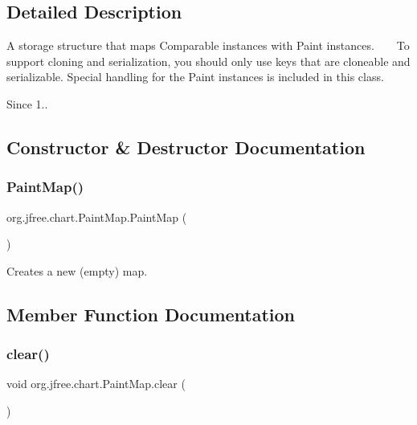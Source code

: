 \subsection{Detailed Description}
A storage structure that maps {\ttfamily Comparable} instances with {\ttfamily Paint} instances. ~\newline
~\newline
 To support cloning and serialization, you should only use keys that are cloneable and serializable. Special handling for the {\ttfamily Paint} instances is included in this class.

\begin{DoxySince}{Since}
1.. 
\end{DoxySince}


\subsection{Constructor \& Destructor Documentation}
\mbox{\label{classorg_1_1jfree_1_1chart_1_1_paint_map_a1685803b58df9efd74550f791c47c9ad}} 
\subsubsection{\texorpdfstring{Paint\+Map()}{PaintMap()}}
{\footnotesize\ttfamily org.\+jfree.\+chart.\+Paint\+Map.\+Paint\+Map (\begin{DoxyParamCaption}{ }\end{DoxyParamCaption})}

Creates a new (empty) map. 

\subsection{Member Function Documentation}
\mbox{\label{classorg_1_1jfree_1_1chart_1_1_paint_map_a15a0aa8e6cbf5339fd3b1ac54d645410}} 
\subsubsection{\texorpdfstring{clear()}{clear()}}
{\footnotesize\ttfamily void org.\+jfree.\+chart.\+Paint\+Map.\+clear (\begin{DoxyParamCaption}{ }\end{DoxyParamCaption})}

